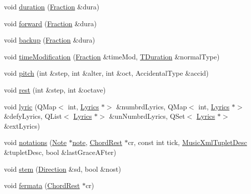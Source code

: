 \begin{DoxyCompactItemize}
\item 
void \hyperlink{class_ms_1_1_music_x_m_l_parser_pass2_abbeef32db00759eb0f1ddb092110456f}{duration} (\hyperlink{class_ms_1_1_fraction}{Fraction} \&dura)
\item 
void \hyperlink{class_ms_1_1_music_x_m_l_parser_pass2_a5886a697115694a24d2aff200aa47425}{forward} (\hyperlink{class_ms_1_1_fraction}{Fraction} \&dura)
\item 
void \hyperlink{class_ms_1_1_music_x_m_l_parser_pass2_af1845a2177dfef1e7c41f9b24542e7d4}{backup} (\hyperlink{class_ms_1_1_fraction}{Fraction} \&dura)
\item 
void \hyperlink{class_ms_1_1_music_x_m_l_parser_pass2_a15374bf1fbe1441af87425e9394bbd3a}{time\+Modification} (\hyperlink{class_ms_1_1_fraction}{Fraction} \&time\+Mod, \hyperlink{class_ms_1_1_t_duration}{T\+Duration} \&normal\+Type)
\item 
void \hyperlink{class_ms_1_1_music_x_m_l_parser_pass2_a016fc02bae1bb7486f0b4b4ddf3b4a94}{pitch} (int \&step, int \&alter, int \&oct, Accidental\+Type \&accid)
\item 
void \hyperlink{class_ms_1_1_music_x_m_l_parser_pass2_a1a33ece7284b3787aadb25575b1d6f45}{rest} (int \&step, int \&octave)
\item 
void \hyperlink{class_ms_1_1_music_x_m_l_parser_pass2_a484fe55303c211ed2d17c236976dfedc}{lyric} (Q\+Map$<$ int, \hyperlink{class_ms_1_1_lyrics}{Lyrics} $\ast$$>$ \&numbrd\+Lyrics, Q\+Map$<$ int, \hyperlink{class_ms_1_1_lyrics}{Lyrics} $\ast$$>$ \&defy\+Lyrics, Q\+List$<$ \hyperlink{class_ms_1_1_lyrics}{Lyrics} $\ast$$>$ \&un\+Numbrd\+Lyrics, Q\+Set$<$ \hyperlink{class_ms_1_1_lyrics}{Lyrics} $\ast$$>$ \&ext\+Lyrics)
\item 
void \hyperlink{class_ms_1_1_music_x_m_l_parser_pass2_ab712c5ff2628853b9071ef50a3b84bc4}{notations} (\hyperlink{class_ms_1_1_note}{Note} $\ast$\hyperlink{class_ms_1_1_music_x_m_l_parser_pass2_acc37a226f30b5759c9ce8306b780b2fc}{note}, \hyperlink{class_ms_1_1_chord_rest}{Chord\+Rest} $\ast$cr, const int tick, \hyperlink{struct_ms_1_1_music_xml_tuplet_desc}{Music\+Xml\+Tuplet\+Desc} \&tuplet\+Desc, bool \&last\+Grace\+A\+Fter)
\item 
void \hyperlink{class_ms_1_1_music_x_m_l_parser_pass2_ae0a8ca011a423a2b39dc803e6fb66361}{stem} (\hyperlink{class_ms_1_1_direction}{Direction} \&sd, bool \&nost)
\item 
void \hyperlink{class_ms_1_1_music_x_m_l_parser_pass2_a046b0637cee67d43902bead56c8602eb}{fermata} (\hyperlink{class_ms_1_1_chord_rest}{Chord\+Rest} $\ast$cr)

\end{DoxyCompactItemize}
